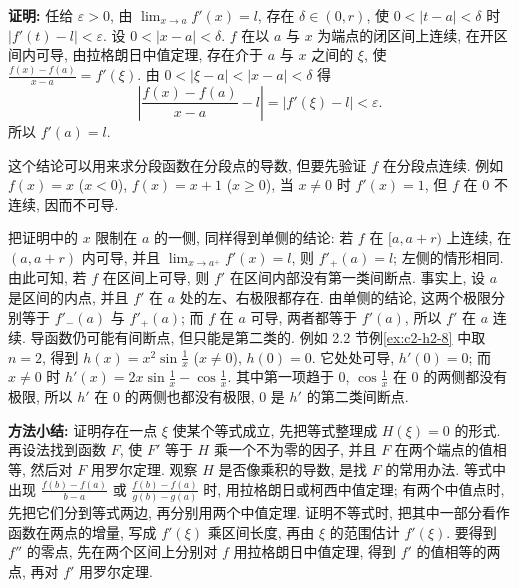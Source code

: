 \documentclass[UTF8,openany]{ctexbook}
\theoremstyle{chinesetextbook}
\newenvironment{cnproof}{\par\indent\textbf{证明:} \ignorespaces}{\par}
\begin{document}
\begin{cnproof}
任给 $\varepsilon>0$, 由 $\displaystyle\lim_{x\to a}f'(x)=l$, 存在 $\delta\in(0,r)$, 使 $0<|t-a|<\delta$ 时 $|f'(t)-l|<\varepsilon$. 设 $0<|x-a|<\delta$. $f$ 在以 $a$ 与 $x$ 为端点的闭区间上连续, 在开区间内可导, 由拉格朗日中值定理, 存在介于 $a$ 与 $x$ 之间的 $\xi$, 使 $\displaystyle\frac{f(x)-f(a)}{x-a}=f'(\xi)$. 由 $0<|\xi-a|<|x-a|<\delta$ 得
\[
\left|\frac{f(x)-f(a)}{x-a}-l\right|=|f'(\xi)-l|<\varepsilon.
\]
所以 $f'(a)=l$.
\end{cnproof}
这个结论可以用来求分段函数在分段点的导数, 但要先验证 $f$ 在分段点连续. 例如 $f(x)=x$ ($x<0$), $f(x)=x+1$ ($x\ge0$), 当 $x\ne0$ 时 $f'(x)=1$, 但 $f$ 在 $0$ 不连续, 因而不可导.

把证明中的 $x$ 限制在 $a$ 的一侧, 同样得到单侧的结论: 若 $f$ 在 $[a,a+r)$ 上连续, 在 $(a,a+r)$ 内可导, 并且 $\displaystyle\lim_{x\to a^+}f'(x)=l$, 则 $f'_+(a)=l$; 左侧的情形相同. 由此可知, 若 $f$ 在区间上可导, 则 $f'$ 在区间内部没有第一类间断点. 事实上, 设 $a$ 是区间的内点, 并且 $f'$ 在 $a$ 处的左、右极限都存在. 由单侧的结论, 这两个极限分别等于 $f'_-(a)$ 与 $f'_+(a)$; 而 $f$ 在 $a$ 可导, 两者都等于 $f'(a)$, 所以 $f'$ 在 $a$ 连续. 导函数仍可能有间断点, 但只能是第二类的. 例如 2.2 节例\ref{ex:c2-h2-8} 中取 $n=2$, 得到 $\displaystyle h(x)=x^2\sin\frac1x$ ($x\ne0$), $h(0)=0$. 它处处可导, $h'(0)=0$; 而 $x\ne0$ 时 $\displaystyle h'(x)=2x\sin\frac1x-\cos\frac1x$. 其中第一项趋于 $0$, $\displaystyle\cos\frac1x$ 在 $0$ 的两侧都没有极限, 所以 $h'$ 在 $0$ 的两侧也都没有极限, $0$ 是 $h'$ 的第二类间断点.
\par\indent\textbf{方法小结:} 证明存在一点 $\xi$ 使某个等式成立, 先把等式整理成 $H(\xi)=0$ 的形式. 再设法找到函数 $F$, 使 $F'$ 等于 $H$ 乘一个不为零的因子, 并且 $F$ 在两个端点的值相等, 然后对 $F$ 用罗尔定理. 观察 $H$ 是否像乘积的导数, 是找 $F$ 的常用办法. 等式中出现 $\displaystyle\frac{f(b)-f(a)}{b-a}$ 或 $\displaystyle\frac{f(b)-f(a)}{g(b)-g(a)}$ 时, 用拉格朗日或柯西中值定理; 有两个中值点时, 先把它们分到等式两边, 再分别用两个中值定理. 证明不等式时, 把其中一部分看作函数在两点的增量, 写成 $f'(\xi)$ 乘区间长度, 再由 $\xi$ 的范围估计 $f'(\xi)$. 要得到 $f''$ 的零点, 先在两个区间上分别对 $f$ 用拉格朗日中值定理, 得到 $f'$ 的值相等的两点, 再对 $f'$ 用罗尔定理.
\end{document}

